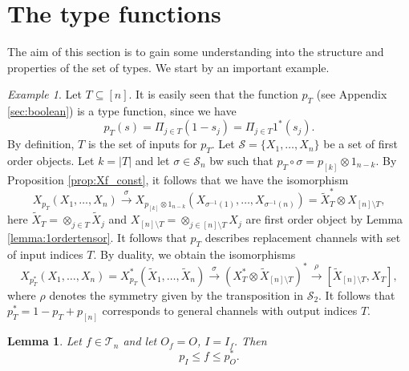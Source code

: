\documentclass[12pt]{article}
\newtheorem{lemma}{Lemma}
\theoremstyle{definition}
\theoremstyle{remark}
\newtheorem{exm}{Example}
\def\Te{\mathcal T}
\def\Se {\mathcal S}
\def\permut{\mathscr{S}}
\begin{document}
\section{The type functions}

The aim of this section is to gain some understanding into the structure and properties of
the set of types. We start by an important example.


\begin{exm}\label{exm:type_channels}
Let $T\subseteq [n]$. It is easily seen that the function  $p_T$ (see Appendix
\ref{sec:boolean}) is a type function, since we have
\[
p_T(s)=\Pi_{j\in T}(1-s_j)=\Pi_{j\in T} 1^*(s_j).
\]
By definition, $T$ is the set of inputs for $p_T$. Let $\Se=\{X_1,\dots, X_n\}$ be a set
of first order objects. Let $k=|T|$ and let $\sigma\in \permut_n$ bw such that
$p_T\circ \sigma=p_{[k]}\otimes 1_{n-k}$. By Proposition \ref{prop:Xf_const}, it follows that
we have the isomorphism  
\[
X_{p_T}(X_1,\dots,X_n)\xrightarrow{\sigma}X_{p_{[k]}\otimes 1_{n-k}}(X_{\sigma^{-1}(1)},\dots, X_{\sigma^{-1}(n)})=\tilde
X_T^*\otimes X_{[n]\setminus T},
\]
here $\tilde X_T=\otimes_{j\in T} \tilde X_j$ and $X_{[n]\setminus T}=\otimes_{j\in
[n]\setminus T} X_j$ are first order object by Lemma \ref{lemma:1ordertensor}.
It follows that $p_T$ describes replacement channels with set of input indices  $T$. By duality,
we obtain the isomorphisms
\[
X_{p_T^*}(X_1,\dots,X_n)=X_{p_T}^*(\tilde X_1,\dots,\tilde X_n)\xrightarrow{\sigma} (X_T^*\otimes \tilde
X_{[n]\setminus T})^*\xrightarrow{\rho}  [\tilde X_{[n]\setminus T},X_T],
\]
where $\rho$ denotes the symmetry given by the transposition in $\permut_2$. It follows
that $p^*_T=1-p_T+p_{[n]}$ corresponds to general channels with output indices $T$.

\end{exm}


\begin{lemma}\label{lemma:fh_setting} Let $f\in\Te_n$ and let $O_f=O$,  $I=I_f$. Then
\[
p_I\le f\le p_O^*.
\]

\end{lemma}
\end{document}
